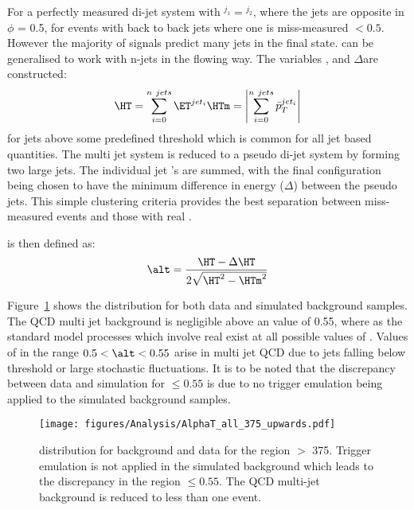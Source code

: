 For a perfectly measured di-jet system with \ET$^{j_{1}} = $\ET$^{j_{2}}$, 
where the jets are opposite in $\phi$ \alt = 0.5, for events with back to back 
jets where one is miss-measured \alt $ < 0.5$.
However the majority of signals predict many jets in the final state.
\alt can be generalised to work with n-jets in the flowing way.
The variables \HT, \HTm and $\Delta$\HT are constructed:
\begin{equation}
  \HT = \sum_{i = 0}^{n~jets}\ET^{jet_{i}} \\
  \HTm = \left|\sum_{i = 0}^{n~jets}\bar{p}_{T}^{jet_{i}}\right|
\end{equation}
for jets above some predefined threshold \ET which is common for all jet based 
quantities. The multi jet system is reduced to a pseudo di-jet system by 
forming two large jets. The individual jet \ET's are summed, with the final 
configuration being chosen to have the minimum difference in energy 
($\Delta$\HT) between the pseudo jets. This simple clustering criteria provides 
the best separation between miss-measured events and those with real \MET.

\alt is then defined as:
\begin{equation}
  \alt = \frac{\HT - \Delta\HT}{2\sqrt{\HT^{2}-\HTm^{2}}}
\end{equation}


Figure~\ref{fig:figures_Analysis_AlphaT_all_375_upwards} shows the \alt 
distribution for both data and simulated background samples. The QCD multi jet 
background is negligible above an \alt value of 0.55, where as the standard 
model processes which involve real \MET exist at all possible values of \alt.
Values of \alt in the range $0.5 < \alt < 0.55$ arise in multi jet QCD due to 
jets falling below threshold or large stochastic fluctuations.
It is to be noted that the discrepancy between data and simulation for \alt 
$\leq 0.55$ is due to no trigger emulation being applied to the simulated 
background samples.
\begin{figure}[ht|]
  \centering  \texttt{[image: figures/Analysis/AlphaT\_all\_375\_upwards.pdf]}
  \caption{\alt distribution for background and data for the region \HT $>$ 
  \unit{375}{\GeV}. Trigger emulation is not applied in the simulated 
  background which leads to the discrepancy in the region \alt $\leq 0.55$. The 
  QCD multi-jet background is reduced to less than one event.}
  \label{fig:figures_Analysis_AlphaT_all_375_upwards}
\end{figure}

